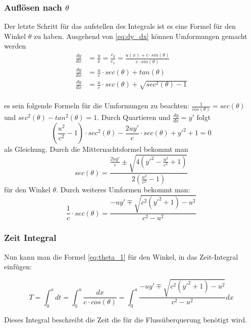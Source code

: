\subsubsection{Auflösen nach \(\theta\)}

Der letzte Schritt für das aufstellen des Integrals ist es eine Formel für den Winkel \(\theta\) zu haben.
Ausgehend von \ref{eq:dy_dx} können Umformungen gemacht werden
\begin{align}
    \frac{dy}{dx} &= \frac{\dot{y}}{\dot{x}} = \frac{c_y}{c_x} = \frac{u(x) + c \cdot sin(\theta)}{c \cdot sin(\theta)} \\
    \frac{dy}{dx} &= \frac{u}{c}\cdot sec(\theta) + tan(\theta) \\
    \frac{dy}{dx} &= \frac{u}{c}\cdot sec(\theta) + \sqrt{sec^2(\theta)-1} \\
\end{align}

es sein folgende Formeln für die Umformungen zu beachten: \(\frac{1}{cos(\theta)} = sec(\theta)\) und \(sec^2(\theta)-tan^2(\theta) = 1\). Durch Quartieren und \(\frac{dy}{dx} = y'\) folgt 
\begin{equation}
    (\frac{u^2}{c^2}-1)\cdot sec^2(\theta) - \frac{2uy'}{c}\cdot sec(\theta) + y'^2 +1 = 0
\end{equation}
als Gleichung. Durch die Mitternachtsformel bekommt man 
\begin{equation}
    sec(\theta) = \frac{\frac{2uy'}{c} \pm \sqrt{4(y'^2-\frac{u^2}{c^2} + 1)}}{2(\frac{u^2}{c^2}-1)}
\end{equation}
für den Winkel \(\theta\). Durch weiteres Umformen bekommt man:
\begin{equation}
    \frac{1}{c}\cdot sec(\theta) = \frac{-uy' \mp \sqrt{c^2(y'^2+1)-u^2}}{c^2-u^2} \label{eq:theta_1}
\end{equation}


\subsubsection{Zeit Integral}

Nun kann man die Formel \ref{eq:theta_1} für den Winkel, in das Zeit-Integral einfügen:

\begin{equation}
    T = \int_0^adt = \int_0^a\frac{dx}{c\cdot cos(\theta)} = \int_0^a \frac{-uy' \mp \sqrt{c^2(y'^2+1)-u^2}}{c^2-u^2} dx
    \label{eq:Time_river_2} 
\end{equation}

Dieses Integral  beschreibt die Zeit die für die Flussüberquerung benötigt wird. 




